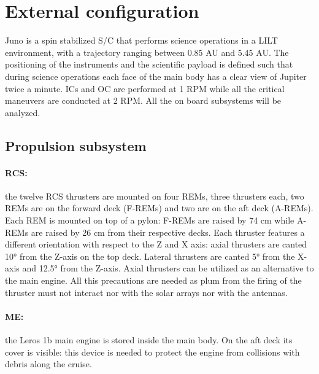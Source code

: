 \section{External configuration}
\label{sec:external_config}

Juno is a spin stabilized S/C that performs science operations in a LILT environment, with a trajectory ranging between 0.85 AU and 5.45 AU. The positioning of the instruments and the scientific payload is defined such that during science operations each face of the main body has a clear view of Jupiter twice a minute. ICs and OC are performed at 1 RPM while all the critical maneuvers are conducted at 2 RPM. All the on board subsystems will be analyzed. 

\subsection{Propulsion subsystem}
\label{subsec:prop_sub}

\paragraph{RCS:}the twelve RCS thrusters are mounted on four REMs, three thrusters each, two REMs are on the forward deck (F-REMs) and two are on the aft deck (A-REMs). 
Each REM is mounted on top of a pylon: F-REMs are raised by 74 cm while A-REMs are raised by 26 cm from their respective decks. Each thruster features a different orientation with respect to the Z and X axis: axial thrusters are canted 10° from the Z-axis on the top deck. Lateral thrusters are canted 5° from the X-axis and 12.5° from the Z-axis. Axial thrusters can be utilized as an alternative to the main engine.  
\mref
All this precautions are needed as plum from the firing of the thruster must not interact nor with the solar arrays nor with the antennas.
\vspace{-4mm}

\paragraph{ME:}the Leros 1b main engine is stored inside the main body. On the aft deck its cover is visible: this device is needed to protect the engine from collisions with debris along the cruise. 

